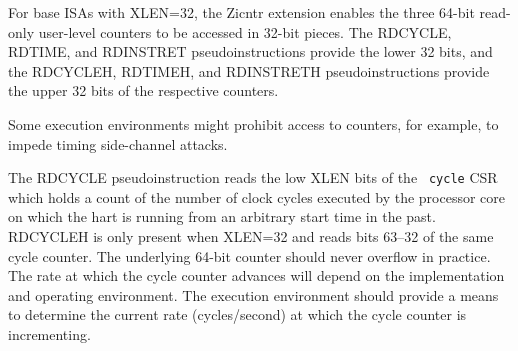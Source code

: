 For base ISAs with XLEN=32, the Zicntr extension enables the three
64-bit read-only user-level counters to be accessed in 32-bit pieces.
The RDCYCLE, RDTIME, and RDINSTRET pseudoinstructions provide the lower 32
bits, and the RDCYCLEH, RDTIMEH, and RDINSTRETH pseudoinstructions provide
the upper 32 bits of the respective counters.

\begin{commentary}
Some execution environments might prohibit access to counters, for
example, to impede timing side-channel attacks.
\end{commentary}

The RDCYCLE pseudoinstruction reads the low XLEN bits of the {\tt
  cycle} CSR which holds a count of the number of clock cycles
executed by the processor core on which the hart is running from an
arbitrary start time in the past.  RDCYCLEH is only present when
XLEN=32 and reads bits 63--32 of the same cycle
counter.  The underlying 64-bit counter should never overflow in
practice.  The rate at which the cycle counter advances will depend on
the implementation and operating environment.  The execution
environment should provide a means to determine the current rate
(cycles/second) at which the cycle counter is incrementing.

